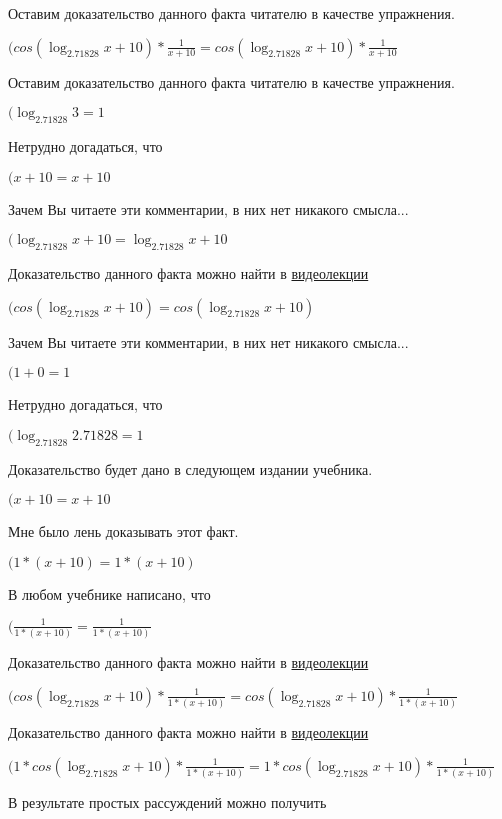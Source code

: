 \documentclass[12pt,a4paper,fleqn]{article}
\theoremstyle{definition}
\begin{document}
Оставим доказательство данного факта читателю в качестве упражнения.

$(cos(\log_{ 2.71828 }{ x  +  10 }) * \frac{ 1 }{ x  +  10 }
 = cos(\log_{ 2.71828 }{ x  +  10 }) * \frac{ 1 }{ x  +  10 }
$

Оставим доказательство данного факта читателю в качестве упражнения.

$(\log_{ 2.71828 }{ 3 } =  1 $

Нетрудно догадаться, что

$( x  +  10  =  x  +  10 $

Зачем Вы читаете эти комментарии, в них нет никакого смысла...

$(\log_{ 2.71828 }{ x  +  10 } = \log_{ 2.71828 }{ x  +  10 }$

Доказательство данного факта можно найти в \href{https://www.youtube.com/watch?v=dQw4w9WgXcQ}{видеолекции}

$(cos(\log_{ 2.71828 }{ x  +  10 }) = cos(\log_{ 2.71828 }{ x  +  10 })$

Зачем Вы читаете эти комментарии, в них нет никакого смысла...

$( 1  +  0  =  1 $

Нетрудно догадаться, что

$(\log_{ 2.71828 }{ 2.71828 } =  1 $

Доказательство будет дано в следующем издании учебника.

$( x  +  10  =  x  +  10 $

Мне было лень доказывать этот факт.

$( 1  * ( x  +  10 ) =  1  * ( x  +  10 )$

В любом учебнике написано, что

$(\frac{ 1 }{ 1  * ( x  +  10 )}
 = \frac{ 1 }{ 1  * ( x  +  10 )}
$

Доказательство данного факта можно найти в \href{https://www.youtube.com/watch?v=dQw4w9WgXcQ}{видеолекции}

$(cos(\log_{ 2.71828 }{ x  +  10 }) * \frac{ 1 }{ 1  * ( x  +  10 )}
 = cos(\log_{ 2.71828 }{ x  +  10 }) * \frac{ 1 }{ 1  * ( x  +  10 )}
$

Доказательство данного факта можно найти в \href{https://www.youtube.com/watch?v=dQw4w9WgXcQ}{видеолекции}

$( 1  * cos(\log_{ 2.71828 }{ x  +  10 }) * \frac{ 1 }{ 1  * ( x  +  10 )}
 =  1  * cos(\log_{ 2.71828 }{ x  +  10 }) * \frac{ 1 }{ 1  * ( x  +  10 )}
$

В результате простых рассуждений можно получить
\end{document}
